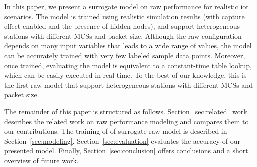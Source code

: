 In this paper, we present a surrogate model on \gls{raw} performance for realistic \gls{iot} scenarios. The model is trained using realistic simulation results (with capture effect enabled and the presence of hidden nodes), and support heterogeneous stations with different MCSs and packet size. Although the \gls{raw} configuration depends on many input variables that leads to a wide range of values, the model can be accurately trained with very few labeled sample data points. Moreover, once trained, evaluating the model is equivalent to a constant-time table lookup, which can be easily executed in real-time. To the best of our knowledge, this is the first \gls{raw} model that support heterogeneous stations with different MCSs and packet size.


The remainder of this paper is structured as follows. Section~\ref{sec:related_work} describes the  related work on \gls{raw} performance modeling and compares them to our contributions.
The training of of surrogate \gls{raw} model is described in Section~\ref{sec:modeling}. Section~\ref{sec:evaluation} evaluates the accuracy of our presented model. Finally, Section~\ref{sec:conclusion} offers conclusions and a short overview of future work.



